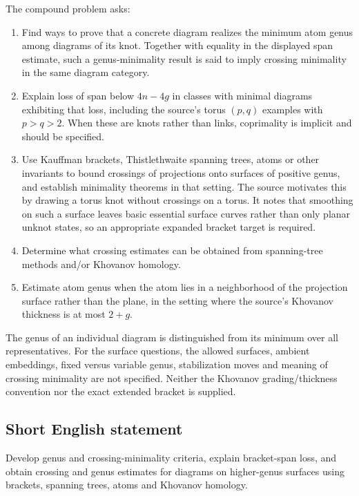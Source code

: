 \documentclass[11pt]{article}
\begin{document}
The compound problem asks:
\begin{enumerate}
\item Find ways to prove that a concrete diagram realizes the minimum atom genus among diagrams of its knot. Together with equality in the displayed span estimate, such a genus-minimality result is said to imply crossing minimality in the same diagram category.
\item Explain loss of span below \(4n-4g\) in classes with minimal diagrams exhibiting that loss, including the source's torus \((p,q)\) examples with \(p>q>2\). When these are knots rather than links, coprimality is implicit and should be specified.
\item Use Kauffman brackets, Thistlethwaite spanning trees, atoms or other invariants to bound crossings of projections onto surfaces of positive genus, and establish minimality theorems in that setting. The source motivates this by drawing a torus knot without crossings on a torus. It notes that smoothing on such a surface leaves basic essential surface curves rather than only planar unknot states, so an appropriate expanded bracket target is required.
\item Determine what crossing estimates can be obtained from spanning-tree methods and/or Khovanov homology.
\item Estimate atom genus when the atom lies in a neighborhood of the projection surface rather than the plane, in the setting where the source's Khovanov thickness is at most \(2+g\).
\end{enumerate}
The genus of an individual diagram is distinguished from its minimum over all representatives. For the surface questions, the allowed surfaces, ambient embeddings, fixed versus variable genus, stabilization moves and meaning of crossing minimality are not specified. Neither the Khovanov grading/thickness convention nor the exact extended bracket is supplied.
\subsection{Short English statement}
Develop genus and crossing-minimality criteria, explain bracket-span loss, and obtain crossing and genus estimates for diagrams on higher-genus surfaces using brackets, spanning trees, atoms and Khovanov homology.
\end{document}
